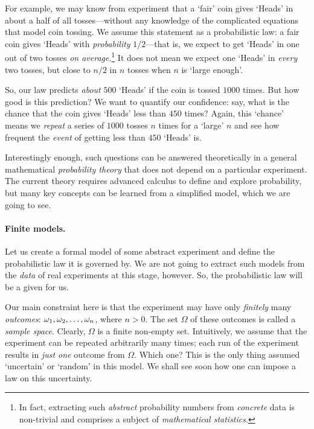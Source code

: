 \documentclass[12pt,notitlepage]{article}
\theoremstyle{plain}
\theoremstyle{definition}
\theoremstyle{plain}
\newcommand{\1}{\mathbf{1}}
\newcommand{\0}{\mathbf{0}}
\begin{document}
For example, we may know from experiment that a `fair' coin gives `Heads' in about a half of all tosses---without any knowledge of the complicated equations that model coin tossing. We assume this statement as a probabilistic law: a fair coin gives `Heads' with \emph{probability} $1/2$---that is, we expect to get `Heads' in one out of two tosses \emph{on average}.\footnote{In fact, extracting such \emph{abstract} probability numbers from \emph{concrete} data is non-trivial and comprises a subject of \emph{mathematical statistics}.} It does not mean we expect one `Heads' in \emph{every} two tosses, but close to $n/2$ in $n$ tosses when $n$ is `large enough'.

So, our law predicts \emph{about} $500$ `Heads' if the coin is tossed $1000$ times. But how good is this prediction? We want to quantify our confidence: say, what is the chance that the coin gives `Heads' less than $450$ times? Again, this `chance' means we \emph{repeat} a series of $1000$ tosses $n$ times for a `large' $n$ and see how frequent the \emph{event} of getting less than $450$ `Heads' is.

Interestingly enough, such questions can be answered theoretically in a general mathematical \emph{probability theory} that does not depend on a particular experiment. The current theory requires advanced calculus to define and explore probability, but many key concepts can be learned from a simplified model, which we are going to see.

\paragraph{Finite models.} Let us create a formal model of some abstract experiment and define the probabilistic law it is governed by. We are not going to extract such models from the \emph{data} of real experiments at this stage, however. So, the probabilistic law will be a given for us.

Our main constraint here is that the experiment may have only \emph{finitely} many \emph{outcomes}: $\omega_1, \omega_2, \ldots,\\ \omega_n$, where $n > 0$. The set $\Omega$ of these outcomes is called a \emph{sample space}. Clearly, $\Omega$ is a finite non-empty set. Intuitively, we assume that the experiment can be repeated arbitrarily many times; each run of the experiment results in \emph{just one} outcome from $\Omega$. Which one? This is the only thing assumed `uncertain' or `random' in this model. We shall see soon how one can impose a law on this uncertainty.
\end{document}
